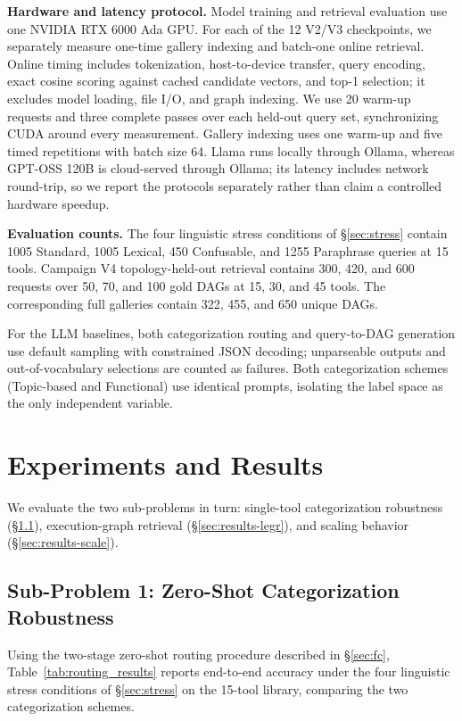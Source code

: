 \documentclass{article}
\begin{document}
\textbf{Hardware and latency protocol.} Model training and retrieval evaluation use one NVIDIA RTX 6000 Ada GPU. For each of the 12 V2/V3 checkpoints, we separately measure one-time gallery indexing and batch-one online retrieval. Online timing includes tokenization, host-to-device transfer, query encoding, exact cosine scoring against cached candidate vectors, and top-1 selection; it excludes model loading, file I/O, and graph indexing. We use 20 warm-up requests and three complete passes over each held-out query set, synchronizing CUDA around every measurement. Gallery indexing uses one warm-up and five timed repetitions with batch size 64. Llama runs locally through Ollama, whereas GPT-OSS 120B is cloud-served through Ollama; its latency includes network round-trip, so we report the protocols separately rather than claim a controlled hardware speedup.

\textbf{Evaluation counts.} The four linguistic stress conditions of \S\ref{sec:stress} contain 1005 Standard, 1005 Lexical, 450 Confusable, and 1255 Paraphrase queries at 15 tools. Campaign V4 topology-held-out retrieval contains 300, 420, and 600 requests over 50, 70, and 100 gold DAGs at 15, 30, and 45 tools. The corresponding full galleries contain 322, 455, and 650 unique DAGs.

For the LLM baselines, both categorization routing and query-to-DAG generation use default sampling with constrained JSON decoding; unparseable outputs and out-of-vocabulary selections are counted as failures. Both categorization schemes (Topic-based and Functional) use identical prompts, isolating the label space as the only independent variable.


\section{Experiments and Results}

We evaluate the two sub-problems in turn: single-tool categorization robustness (\S\ref{sec:results-fc}), execution-graph retrieval (\S\ref{sec:results-legr}), and scaling behavior (\S\ref{sec:results-scale}).

\subsection{Sub-Problem 1: Zero-Shot Categorization Robustness}
\label{sec:results-fc}
Using the two-stage zero-shot routing procedure described in \S\ref{sec:fc}, Table~\ref{tab:routing_results} reports end-to-end accuracy under the four linguistic stress conditions of \S\ref{sec:stress} on the 15-tool library, comparing the two categorization schemes.
\end{document}

